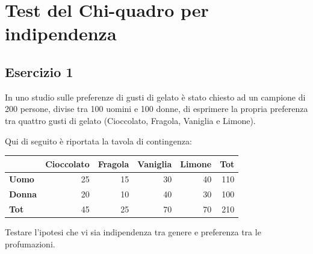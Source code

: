 \documentclass[
  11pt,
]{book}
\theoremstyle{mytheoremstyle}
\theoremstyle{mydefstyle}
\begin{document}
\chapter{Test del Chi-quadro per indipendenza}\label{test-del-chi-quadro-per-indipendenza}

\section{Esercizio 1}\label{esercizio-1-1}

In uno studio sulle preferenze di gusti di gelato è stato chiesto ad un campione di 200 persone, divise tra 100 uomini e 100 donne, di esprimere la propria preferenza tra quattro gusti di gelato (Cioccolato, Fragola, Vaniglia e Limone).

Qui di seguito è riportata la tavola di contingenza:

\begin{table}[H]
\centering
\begin{tabular}{>{}lrrrrr}
\toprule
  & Cioccolato & Fragola & Vaniglia & Limone & Tot\\
\midrule
\textbf{Uomo} & 25 & 15 & 30 & 40 & 110\\
\textbf{Donna} & 20 & 10 & 40 & 30 & 100\\
\textbf{Tot} & 45 & 25 & 70 & 70 & 210\\
\bottomrule
\end{tabular}
\end{table}

Testare l'ipotesi che vi sia indipendenza tra genere e preferenza tra le profumazioni.
\end{document}
